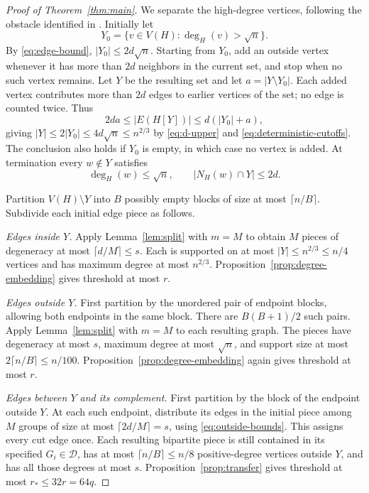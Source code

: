 \documentclass[11pt]{article}
\theoremstyle{remark}
\numberwithin{equation}{section}
\newcommand{\calD}{\mathcal D}
\begin{document}
\begin{proof}[Proof of Theorem~\ref{thm:main}]
We separate the high-degree vertices, following the obstacle
identified in \cite[Section~8]{AHPT26}. Initially let
\[
 Y_0=\{v\in V(H):\deg_H(v)>\sqrt n\}.
\]
By \eqref{eq:edge-bound}, $|Y_0|\leq2d\sqrt n$.
Starting from $Y_0$, add an outside vertex whenever it has more
than $2d$ neighbors in the current set, and stop when no such
vertex remains. Let $Y$ be the resulting set and let
$a=|Y\setminus Y_0|$. Each added vertex contributes more than
$2d$ edges to earlier vertices of the set; no edge is counted
twice. Thus
\[
 2da\leq|E(H[Y])|\leq d(|Y_0|+a),
\]
giving $|Y|\leq2|Y_0|\leq4d\sqrt n\leq n^{2/3}$ by
\eqref{eq:d-upper} and \eqref{eq:deterministic-cutoffs}.
The conclusion also holds if $Y_0$ is empty, in which case no
vertex is added. At termination every $w\notin Y$ satisfies
\begin{equation}\label{eq:outside-bounds}
 \deg_H(w)\leq\sqrt n,\qquad |N_H(w)\cap Y|\leq2d.
\end{equation}

Partition $V(H)\setminus Y$ into $B$ possibly empty blocks
of size at most $\lceil n/B\rceil$. Subdivide each initial
edge piece as follows.

\emph{Edges inside $Y$.}
Apply Lemma~\ref{lem:split} with $m=M$ to obtain $M$ pieces
of degeneracy at most $\lceil d/M\rceil\leq s$.
Each is supported on at most $|Y|\leq n^{2/3}\leq n/4$
vertices and has maximum degree at most $n^{2/3}$.
Proposition~\ref{prop:degree-embedding} gives threshold at most $r$.

\emph{Edges outside $Y$.}
First partition by the unordered pair of endpoint blocks,
allowing both endpoints in the same block. There are
$B(B+1)/2$ such pairs. Apply Lemma~\ref{lem:split} with
$m=M$ to each resulting graph. The pieces have degeneracy
at most $s$, maximum degree at most $\sqrt n$, and support
size at most $2\lceil n/B\rceil\leq n/100$.
Proposition~\ref{prop:degree-embedding} again gives threshold
at most $r$.

\emph{Edges between $Y$ and its complement.}
First partition by the block of the endpoint outside $Y$.
At each such endpoint, distribute its edges in the initial
piece among $M$ groups of size at most $\lceil2d/M\rceil=s$,
using \eqref{eq:outside-bounds}. This assigns every cut edge
once. Each resulting bipartite piece is still contained in its
specified $G_i\in\calD$, has at most $\lceil n/B\rceil\leq n/8$
positive-degree vertices outside $Y$, and has all those degrees
at most $s$. Proposition~\ref{prop:transfer} gives threshold
at most $r_*\leq32r=64q$.


\end{proof}
\end{document}
